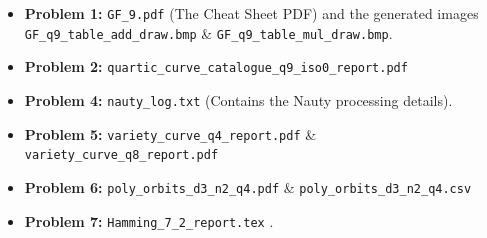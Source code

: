 \documentclass[12pt,a4paper]{article}
\begin{document}
\begin{itemize}
    \item \textbf{Problem 1:} \texttt{GF\_9.pdf} (The Cheat Sheet PDF) and the generated images \texttt{GF\_q9\_table\_add\_draw.bmp} \& \texttt{GF\_q9\_table\_mul\_draw.bmp}.
    \item \textbf{Problem 2:} \texttt{quartic\_curve\_catalogue\_q9\_iso0\_report.pdf}
    \item \textbf{Problem 4:} \texttt{nauty\_log.txt} (Contains the Nauty processing details).
    \item \textbf{Problem 5:} \texttt{variety\_curve\_q4\_report.pdf} \& \texttt{variety\_curve\_q8\_report.pdf}
    \item \textbf{Problem 6:} \texttt{poly\_orbits\_d3\_n2\_q4.pdf} \& \texttt{poly\_orbits\_d3\_n2\_q4.csv}
    \item \textbf{Problem 7:} \texttt{Hamming\_7\_2\_report.tex} .
\end{itemize}
\end{document}
